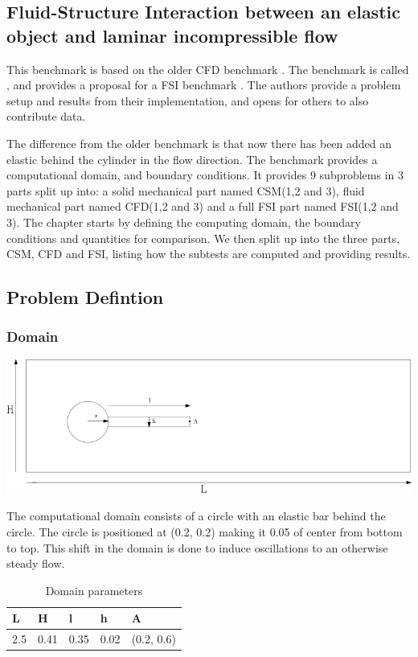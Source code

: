 \subsection{Fluid-Structure Interaction between an elastic object and laminar incompressible flow} \label{sec:HronTurek}
This benchmark is based on the older CFD benchmark  \cite{Turek1996}. The benchmark is called , and provides a proposal for a FSI benchmark \cite{Hron2006a}. The authors provide a problem setup and results from their implementation, and opens for others to also contribute data. \newline

The difference from the older benchmark is that now there has been added an elastic  behind the cylinder in the flow direction. The benchmark provides a computational domain, and boundary conditions. It provides 9 subproblems in 3 parts split up into: a solid mechanical part named CSM(1,2 and 3), fluid mechanical part named CFD(1,2 and 3) and a full FSI part named FSI(1,2 and 3). The chapter starts by defining the computing domain, the boundary conditions and quantities for comparison. We then split up into the three parts, CSM, CFD and FSI, listing how the subtests are computed and providing results.

\subsection*{Problem Defintion}
\subsubsection*{Domain}
\begin{center}
\includegraphics[scale=0.4]{./Verification_Validation/Hron_Turek/Domain_drawing.png}
\end{center}

The computational domain consists of a circle with an elastic bar behind the circle. The circle is positioned at (0.2, 0.2) making it 0.05 of center from bottom to top. This shift in the domain is done to induce oscillations to an otherwise steady flow.
\begin{table}[H]
\centering
\caption{Domain parameters}
\label{my-label}
\begin{tabular}{|l|l|l|l|l|}
\hline
L & H & l & h & A \\ \hline
2.5 & 0.41 & 0.35 & 0.02 & (0.2, 0.6) \\ \hline
\end{tabular}
\end{table}


